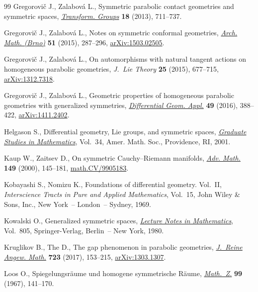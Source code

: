 \documentclass[pdftex]{sigma}
\numberwithin{equation}{section}
\begin{document}
\begin{thebibliography}{99}
Gregorovi\v{c} J., Zalabov\'a L., Symmetric parabolic contact geometries and
 symmetric spaces, \href{https://doi.org/10.1007/s00031-013-9231-z}{\textit{Transform. Groups}} \textbf{18} (2013), 711--737.

Gregorovi\v{c} J., Zalabov\'a L., Notes on symmetric conformal geometries,
 \href{https://doi.org/10.5817/AM2015-5-287}{\textit{Arch. Math. (Brno)}} \textbf{51} (2015), 287--296,
 \href{http://arxiv.org/abs/1503.02505}{arXiv:1503.02505}.

Gregorovi\v{c} J., Zalabov\'a L., On automorphisms with natural tangent actions
 on homogeneous parabolic geometries, \textit{J.~Lie Theory} \textbf{25}
 (2015), 677--715, \href{http://arxiv.org/abs/1312.7318}{arXiv:1312.7318}.

Gregorovi\v{c} J., Zalabov\'a L., Geometric properties of homogeneous parabolic
 geometries with generalized symmetries, \href{https://doi.org/10.1016/j.difgeo.2016.09.008}{\textit{Differential Geom. Appl.}}
 \textbf{49} (2016), 388--422, \href{http://arxiv.org/abs/1411.2402}{arXiv:1411.2402}.

Helgason S., Dif\/ferential geometry, {L}ie groups, and symmetric spaces,
 \href{https://doi.org/10.1090/gsm/034}{\textit{Graduate Studies in Mathematics}}, Vol.~34, Amer. Math. Soc.,
 Providence, RI, 2001.

Kaup W., Zaitsev D., On symmetric {C}auchy--{R}iemann manifolds, \href{https://doi.org/10.1006/aima.1999.1863}{\textit{Adv.
 Math.}} \textbf{149} (2000), 145--181, \href{http://arxiv.org/abs/math.CV/9905183}{math.CV/9905183}.

Kobayashi S., Nomizu K., Foundations of dif\/ferential geometry. {V}ol.~{II},
 \textit{Interscience Tracts in Pure and Applied Mathematics}, Vol.~15, John
 Wiley \& Sons, Inc., New York~-- London~-- Sydney, 1969.

Kowalski O., Generalized symmetric spaces, \href{https://doi.org/10.1007/BFb0103324}{\textit{Lecture Notes in
 Mathematics}}, Vol.~805, Springer-Verlag, Berlin~-- New York, 1980.

Kruglikov B., The D., The gap phenomenon in parabolic geometries,
 \href{https://doi.org/10.1515/crelle-2014-0072}{\textit{J.~Reine Angew. Math.}} \textbf{723} (2017), 153--215,
 \href{http://arxiv.org/abs/1303.1307}{arXiv:1303.1307}.

Loos O., Spiegelungsr\"aume und homogene symmetrische {R}\"aume,
 \href{https://doi.org/10.1007/BF01123745}{\textit{Math.~Z.}} \textbf{99} (1967), 141--170.


\end{thebibliography}
\end{document}
